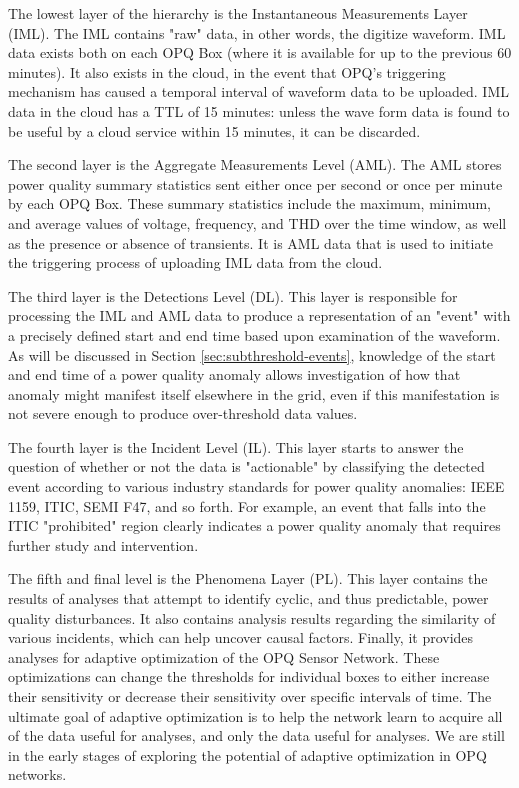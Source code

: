 The lowest layer of the hierarchy is the Instantaneous Measurements Layer (IML). The IML contains "raw" data, in other words, the digitize waveform.  IML data exists both on each OPQ Box (where it is available for up to the previous 60 minutes). It also exists in the cloud, in the event that OPQ's triggering mechanism has caused a temporal interval of waveform data to be uploaded. IML data in the cloud has a TTL of 15 minutes: unless the wave form data is found to be useful by a cloud service within 15 minutes, it can be discarded.

The second layer is the Aggregate Measurements Level (AML). The AML stores power quality summary statistics sent either once per second or once per minute by each OPQ Box. These summary statistics include the maximum, minimum, and average values of voltage, frequency, and THD over the time window, as well as the presence or absence of transients. It is AML data that is used to initiate the triggering process of uploading IML data from the cloud.

The third layer is the Detections Level (DL). This layer is responsible for processing the IML and AML data to produce a representation of an "event" with a precisely defined start and end time based upon examination of the waveform.  As will be discussed in Section \ref{sec:subthreshold-events}, knowledge of the start and end time of a power quality anomaly allows investigation of how that anomaly might manifest itself elsewhere in the grid, even if this manifestation is not severe enough to produce over-threshold data values.

The fourth layer is the Incident Level (IL).  This layer starts to answer the question of whether or not the data is "actionable" by classifying the detected event according to various industry standards for power quality anomalies: IEEE 1159, ITIC, SEMI F47, and so forth.  For example, an event that falls into the ITIC "prohibited" region clearly indicates a power quality anomaly that requires further study and intervention.

The fifth and final level is the Phenomena Layer (PL). This layer contains the results of analyses that attempt to identify cyclic, and thus predictable, power quality disturbances. It also contains analysis results regarding the similarity of various incidents, which can help uncover causal factors.  Finally, it provides analyses for adaptive optimization of the OPQ Sensor Network. These optimizations can change the thresholds for individual boxes to either increase their sensitivity or decrease their sensitivity over specific intervals of time. The ultimate goal of adaptive optimization is to help the network learn to acquire all of the data useful for analyses, and only the data useful for analyses.  We are still in the early stages of exploring the potential of adaptive optimization in OPQ networks.

